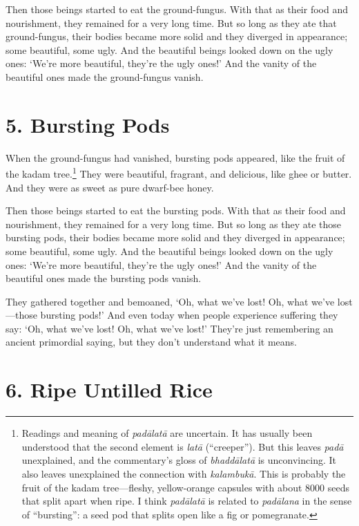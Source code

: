 \documentclass[12pt,openany]{book}%
\begin{document}
Then those beings started to eat the ground-fungus. With that as their food and nourishment, they remained for a very long time. But so long as they ate that ground-fungus, their bodies became more solid and they diverged in appearance; some beautiful, some ugly. And the beautiful beings looked down on the ugly ones: ‘We’re more beautiful, they’re the ugly ones!’ And the vanity of the beautiful ones made the ground-fungus vanish. 

\section*{5. Bursting Pods }

When the ground-fungus had vanished, bursting pods appeared, like the fruit of the kadam tree.\footnote{Readings and meaning of \textit{\textsanskrit{padālatā}} are uncertain. It has usually been understood that the second element is \textit{\textsanskrit{latā}} (“creeper”). But this leaves \textit{\textsanskrit{padā}} unexplained, and the commentary’s gloss of \textit{\textsanskrit{bhaddālatā}} is unconvincing. It also leaves unexplained the connection with \textit{\textsanskrit{kalambukā}}. This is probably the fruit of the kadam tree—fleshy, yellow-orange capsules with about 8000 seeds that split apart when ripe. I think \textit{\textsanskrit{padālatā}} is related to \textit{\textsanskrit{padālana}} in the sense of “bursting”: a seed pod that splits open like a fig or pomegranate. } They were beautiful, fragrant, and delicious, like ghee or butter. And they were as sweet as pure dwarf-bee honey. 

Then those beings started to eat the bursting pods. With that as their food and nourishment, they remained for a very long time. But so long as they ate those bursting pods, their bodies became more solid and they diverged in appearance; some beautiful, some ugly. And the beautiful beings looked down on the ugly ones: ‘We’re more beautiful, they’re the ugly ones!’ And the vanity of the beautiful ones made the bursting pods vanish. 

They gathered together and bemoaned, ‘Oh, what we’ve lost! Oh, what we’ve lost—those bursting pods!’ And even today when people experience suffering they say: ‘Oh, what we’ve lost! Oh, what we’ve lost!’ They’re just remembering an ancient primordial saying, but they don’t understand what it means. 

\section*{6. Ripe Untilled Rice }
\end{document}
